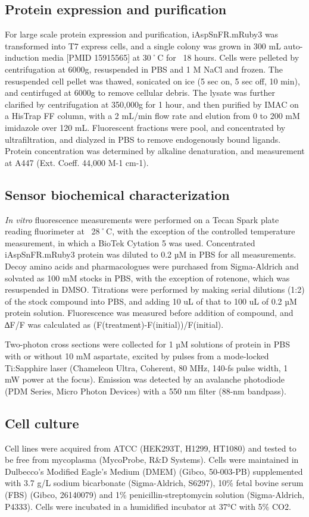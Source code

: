 \documentclass[9pt,lineno]{elife}
\begin{document}
\subsection{Protein expression and purification}
For large scale protein expression and purification, iAspSnFR.mRuby3 was transformed into T7 express cells, and a single colony was grown in 300 mL auto-induction media [PMID 15915565] at 30˚C for ~18 hours.
Cells were pelleted by centrifugation at 6000g, resuspended in PBS and 1 M NaCl and frozen.
The resuspended cell pellet was thawed, sonicated on ice (5 sec on, 5 sec off, 10 min), and centirfuged at 6000g to remove cellular debris.
The lysate was further clarified by centrifugation at 350,000g for 1 hour, and then purified by IMAC on a HisTrap FF column, with a 2 mL/min flow rate and elution from 0 to 200 mM imidazole over 120 mL.
Fluorescent fractions were pool, and concentrated by ultrafiltration, and dialyzed in PBS to remove endogenously bound ligands.
Protein concentration was determined by alkaline denaturation, and measurement at A447 (Ext. Coeff. 44,000 M-1 cm-1).

\subsection{Sensor biochemical characterization}
\textit{In vitro} fluorescence measurements were performed on a Tecan Spark plate reading fluorimeter at ~28˚C, with the exception of the controlled temperature measurement, in which a BioTek Cytation 5 was used.
Concentrated iAspSnFR.mRuby3 protein was diluted to 0.2 µM in PBS for all measurements.
Decoy amino acids and pharmacologues were purchased from Sigma-Aldrich and solvated as 100 mM stocks in PBS, with the exception of rotenone, which was resuspended in DMSO.
Titrations were performed by making serial dilutions (1:2) of the stock compound into PBS, and adding 10 uL of that to 100 uL of 0.2 µM protein solution.
Fluorescence was measured before addition of compound, and ∆F/F was calculated as (F(treatment)-F(initial))/F(initial).

Two-photon cross sections were collected for 1 µM solutions of protein in PBS with or without 10 mM aspartate, excited by pulses from a mode-locked Ti:Sapphire laser (Chameleon Ultra, Coherent, 80 MHz, 140-fs pulse width, 1 mW power at the focus).
Emission was detected by an avalanche photodiode (PDM Series, Micro Photon Devices) with a 550 nm filter (88-nm bandpass).

\subsection{Cell culture}
Cell lines were acquired from ATCC (HEK293T, H1299, HT1080) and tested to be free from mycoplasma (MycoProbe, R\&D Systems).
Cells were maintained in Dulbecco’s Modified Eagle’s Medium (DMEM) (Gibco, 50-003-PB) supplemented with 3.7 g/L sodium bicarbonate (Sigma-Aldrich, S6297), 10\% fetal bovine serum (FBS) (Gibco, 26140079) and 1\% penicillin-streptomycin solution (Sigma-Aldrich, P4333).
Cells were incubated in a humidified incubator at 37°C with 5\% CO2.
\end{document}
